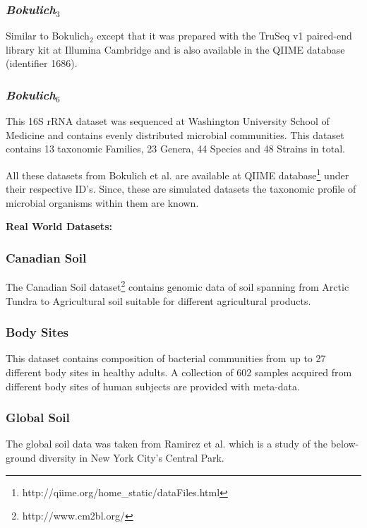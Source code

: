\documentclass[10pt, conference, compsocconf]{IEEEtran}
\begin{document}
\subsubsection{\textit{Bokulich$_3$}}
Similar to Bokulich$_2$ except that it was 
prepared with the 
TruSeq v1 paired-end library kit at 
Illumina Cambridge and is  also available in the 
QIIME database (identifier 1686).

\subsubsection{\textit{Bokulich$_6$}}
This  16S rRNA dataset 
was sequenced at Washington University School of Medicine and contains evenly distributed microbial communities. This dataset contains 13 taxonomic Families, 23 Genera, 44 Species and 48 Strains in total.

All these datasets from Bokulich et al. \cite{MARmockDatasetRef} are available at QIIME database\footnote{http://qiime.org/home\_static/dataFiles.html} under their respective ID's. Since, these are simulated datasets the taxonomic profile of microbial organisms within them are known.

\textbf{Real World Datasets:}

\subsubsection{Canadian Soil}
The Canadian Soil dataset\footnote{http://www.cm2bl.org/} contains genomic data of soil spanning from Arctic Tundra to Agricultural soil suitable for different agricultural products.  

\subsubsection{Body Sites}
This dataset contains composition of bacterial communities from up to 27 different body sites in healthy adults. A collection of 602 samples acquired from different body sites of human subjects are provided with meta-data.

\subsubsection{Global Soil}
The global soil data was taken from Ramirez et al. \cite{MARglobalSoil} which is a study of the below-ground diversity in New York City's Central Park.
\end{document}
